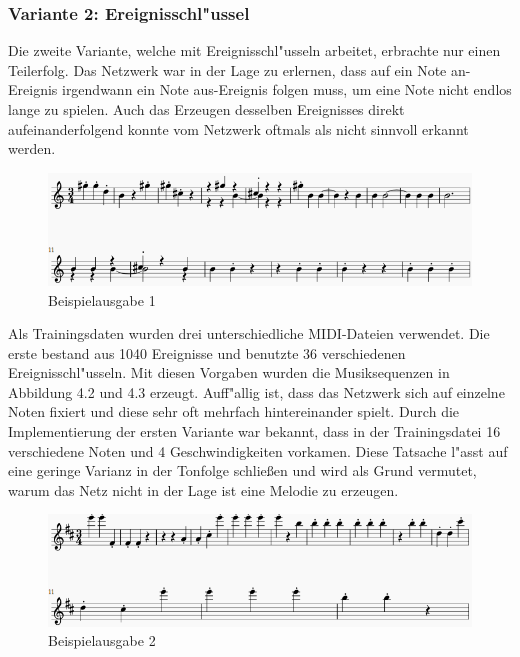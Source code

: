 {\subsubsection{Variante 2: Ereignisschl"ussel}
Die zweite Variante, welche mit Ereignisschl"usseln arbeitet, erbrachte nur einen Teilerfolg. Das Netzwerk war in der Lage zu erlernen, dass auf ein {\glqq}Note an{\grqq}-Ereignis irgendwann ein {\glqq}Note aus{\grqq}-Ereignis folgen muss, um eine Note nicht endlos lange zu spielen. Auch das Erzeugen desselben Ereignisses direkt aufeinanderfolgend konnte vom Netzwerk oftmals als nicht sinnvoll erkannt werden.
\renewcommand{\figurename}{Abb.}
\begin{figure}[htp]
\centering
\includegraphics[width=1\textwidth]{pictures/sampleMidi1.png}
\caption[Beispielausgabe 1]{Beispielausgabe 1}
\end{figure}

Als Trainingsdaten wurden drei unterschiedliche MIDI-Dateien verwendet. Die erste bestand aus 1040 Ereignisse und benutzte 36 verschiedenen Ereignisschl"usseln. Mit diesen Vorgaben wurden die Musiksequenzen in Abbildung 4.2 und 4.3 erzeugt. Auff"allig ist, dass das Netzwerk sich auf einzelne Noten fixiert und diese sehr oft mehrfach hintereinander spielt. Durch die Implementierung der ersten Variante war bekannt, dass in der Trainingsdatei 16 verschiedene Noten und 4 Geschwindigkeiten vorkamen. Diese Tatsache l"asst auf eine geringe Varianz in der Tonfolge schlie{\ss}en und wird als Grund vermutet, warum das Netz nicht in der Lage ist eine Melodie zu erzeugen.

\renewcommand{\figurename}{Abb.}
\begin{figure}[htp]
\centering
\includegraphics[width=1\textwidth]{pictures/sampleMidi2.png}
\caption[Beispielausgabe 2]{Beispielausgabe 2}
\end{figure}

}
